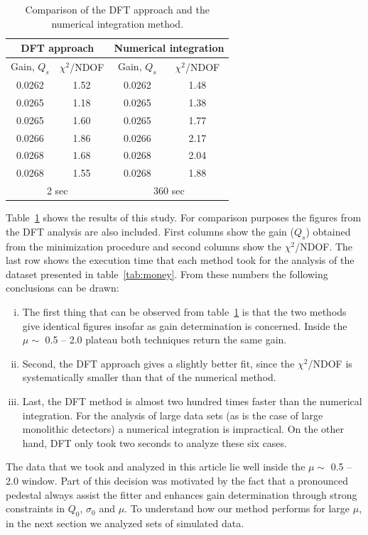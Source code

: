 \documentclass[a4paper,11pt]{article}
\begin{document}
\begin{table}[t!]
\centering
\begin{tabular}{| c  | c  | c | c | }
\hline  \multicolumn{2}{|c|}{ DFT approach} & \multicolumn{2}{|c|}{Numerical integration} \\[0.6ex] \hline\hline
  Gain, $Q_s$ & $\chi^2$/NDOF & Gain, $Q_s$  & $\chi^2$/NDOF \\ \hline
 0.0262 & 1.52 & 0.0262 & 1.48 \\
 0.0265 & 1.18 & 0.0265 & 1.38 \\ 
 0.0265 & 1.60 & 0.0265 & 1.77 \\ 
 0.0266 & 1.86 & 0.0266 & 2.17 \\ 
 0.0268 & 1.68 & 0.0268 & 2.04 \\
 0.0268 & 1.55 & 0.0268 & 1.88
\\[0.6ex] \hline\hline 
\multicolumn{2}{|c|}{ 2 sec } & \multicolumn{2}{|c|}{ 360 sec } \\  \hline
\end{tabular}
\caption{Comparison of the DFT approach and the numerical integration method.} 
\label{tab:comp}
\end{table}

Table~\ref{tab:comp} shows the results of this study.
For comparison purposes the figures from the DFT analysis are also included. 
First columns show the gain ($Q_s$) obtained from the minimization procedure and second columns show the $\chi^2$/NDOF. 
The last row shows the execution time that each method took for the analysis of the dataset presented in table~\ref{tab:money}.
From these numbers the following conclusions can be drawn:
\begin{enumerate}[i.]
\item The first thing that can be observed from table~\ref{tab:comp} is that the two methods give identical figures insofar as gain determination is concerned. 
Inside the $\mu\sim$ 0.5 -- 2.0 plateau both techniques return the same gain. 
\item Second, the DFT approach gives a slightly better fit, since the $\chi^2$/NDOF is systematically smaller than that of the numerical method. 
\item Last, the DFT method is almost two hundred times faster than the numerical integration. 
For the analysis of large data sets (as is the case of large monolithic detectors) a numerical integration is impractical. 
On the other hand, DFT only took two seconds to analyze these six cases. 
\end{enumerate}
The data that we took and analyzed in this article lie well inside the $\mu\sim$ 0.5 -- 2.0 window. 
Part of this decision was motivated by the fact that a pronounced pedestal always assist the fitter and enhances gain determination through strong constraints in $Q_0$, $\sigma_0$ and $\mu$. 
To understand how our method performs for large $\mu$, in the next section we analyzed sets of simulated data.  
\end{document}
